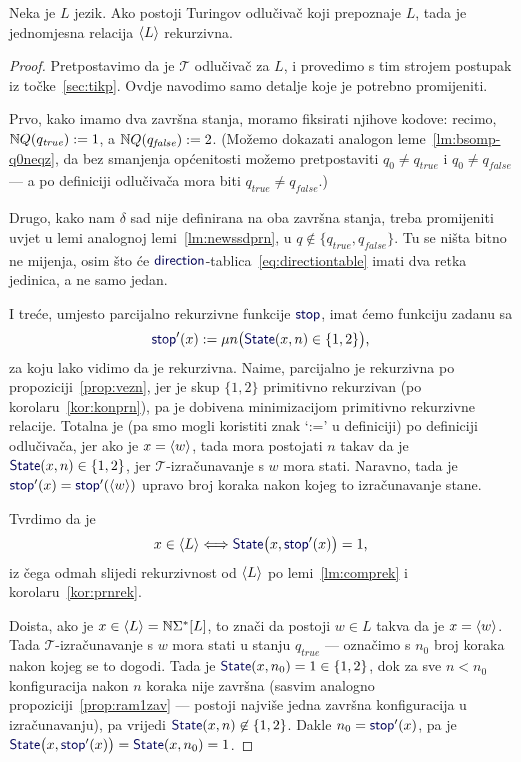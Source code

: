\begin{teorem}\label{tm:oikr}
Neka je $L$ jezik. Ako postoji Turingov odlučivač koji prepoznaje $L$, tada je jednomjesna relacija $\langle L\rangle$ rekurzivna.
\end{teorem}
\begin{proof}
Pretpostavimo da je $\mathcal T$ odlučivač za $L$, i provedimo s tim strojem postupak iz točke~\ref{sec:tikp}. Ovdje navodimo samo detalje koje je potrebno promijeniti.

Prvo, kako imamo dva završna stanja, moramo fiksirati njihove kodove: recimo, ${\mathbb N} Q(q_\mathit{true}):=1$, a ${\mathbb N} Q(q_\mathit{false}):=2$. (Možemo dokazati analogon leme~\ref{lm:bsomp-q0neqz}, da bez smanjenja općenitosti možemo pretpostaviti $q_0\not=q_\mathit{true}$ i $q_0\not=q_\mathit{false}$ --- a po definiciji odlučivača mora biti $q_\mathit{true}\not=q_\mathit{false}$.)

Drugo, kako nam $\delta$ sad nije definirana na oba završna stanja, treba promijeniti uvjet u lemi analognoj lemi~\ref{lm:newssdprn}, u $q\not\in\{q_\mathit{true},q_\mathit{false}\}$. Tu se ništa bitno ne mijenja, osim što će $\f{direction}$-tablica~\eqref{eq:directiontable} imati dva retka jedinica, a ne samo jedan.

I treće, umjesto parcijalno rekurzivne funkcije $\f{stop}$, imat ćemo funkciju zadanu sa
\begin{equation}
    \f{stop}'(x):=\mu n\bigl(\f{State}(x,n)\in\{1,2\}\bigr)\text,
\end{equation}
za koju lako vidimo da je rekurzivna. Naime, parcijalno je rekurzivna po propoziciji~\ref{prop:vezn}, jer je skup $\{1,2\}$ primitivno rekurzivan (po korolaru~\ref{kor:konprn}), pa je dobivena minimizacijom primitivno rekurzivne relacije. Totalna je (pa smo mogli koristiti znak `:=' u definiciji) po definiciji odlučivača, jer ako je $x=\langle w\rangle$, tada mora postojati $n$ takav da je $\f{State}(x,n)\in\{1,2\}$, jer $\mathcal T$-izračunavanje s $w$ mora stati.
Naravno, tada je $\f{stop}'(x)=\f{stop}'(\kr w)$ upravo broj koraka nakon kojeg to iz\-ra\-ču\-na\-va\-nje stane.

Tvrdimo da je
\begin{equation}
    x\in\kr L\Longleftrightarrow\f{State}\bigl(x,\f{stop}'(x)\bigr)=1\text,
\end{equation}
iz čega odmah slijedi rekurzivnost od $\langle L\rangle$ po lemi~\ref{lm:comprek} i korolaru~\ref{kor:prnrek}. 

Doista, ako je $x\in\langle L\rangle={\mathbb N}\Sigma^*[L]$, to znači da postoji $w\in L$ takva da je $x=\langle w\rangle$. Tada $\mathcal T$-izračunavanje s $w$ mora stati u stanju $q_\mathit{true}$ --- označimo s $n_0$ broj koraka nakon kojeg se to dogodi. Tada je $\f{State}(x,n_0)=1\in\{1,2\}$, dok za sve $n<n_0$ konfiguracija nakon $n$ koraka nije završna (sasvim analogno propoziciji~\ref{prop:ram1zav} --- postoji najviše jedna završna konfiguracija u izračunavanju), pa vrijedi $\f{State}(x,n)\not\in\{1,2\}$. Dakle $n_0=\f{stop}'(x)$, pa je $\f{State}\bigl(x,\f{stop}'(x)\bigr)=\f{State}(x,n_0)=1$.


\end{proof}
